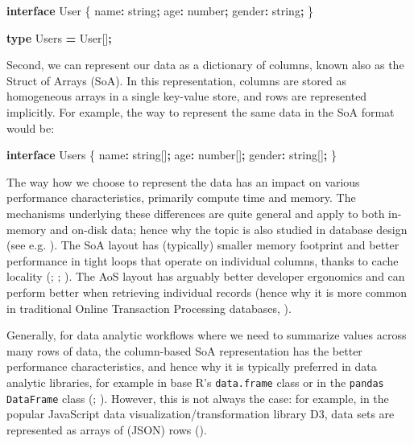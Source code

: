 \documentclass[
]{book}
\newenvironment{Shaded}{\begin{snugshade}}{\end{snugshade}}
\newcommand{\DataTypeTok}[1]{\textcolor[rgb]{0.13,0.29,0.53}{#1}}
\newcommand{\KeywordTok}[1]{\textcolor[rgb]{0.13,0.29,0.53}{\textbf{#1}}}
\newcommand{\NormalTok}[1]{#1}
\newcommand{\OperatorTok}[1]{\textcolor[rgb]{0.81,0.36,0.00}{\textbf{#1}}}
\theoremstyle{definition}
\theoremstyle{definition}
\theoremstyle{definition}
\theoremstyle{definition}
\theoremstyle{remark}
\begin{document}
\begin{Shaded}
\begin{Highlighting}[]
\KeywordTok{interface}\NormalTok{ User \{}
\NormalTok{  name}\OperatorTok{:} \DataTypeTok{string}\OperatorTok{;}
\NormalTok{  age}\OperatorTok{:} \DataTypeTok{number}\OperatorTok{;}
\NormalTok{  gender}\OperatorTok{:} \DataTypeTok{string}\OperatorTok{;}
\NormalTok{\}}

\KeywordTok{type}\NormalTok{ Users }\OperatorTok{=}\NormalTok{ User[]}\OperatorTok{;}
\end{Highlighting}
\end{Shaded}

Second, we can represent our data as a dictionary of columns, known also as the Struct of Arrays (SoA). In this representation, columns are stored as homogeneous arrays in a single key-value store, and rows are represented implicitly. For example, the way to represent the same data in the SoA format would be:

\begin{Shaded}
\begin{Highlighting}[]
\KeywordTok{interface}\NormalTok{ Users \{}
\NormalTok{  name}\OperatorTok{:} \DataTypeTok{string}\NormalTok{[]}\OperatorTok{;}
\NormalTok{  age}\OperatorTok{:} \DataTypeTok{number}\NormalTok{[]}\OperatorTok{;}
\NormalTok{  gender}\OperatorTok{:} \DataTypeTok{string}\NormalTok{[]}\OperatorTok{;}
\NormalTok{\}}
\end{Highlighting}
\end{Shaded}

The way how we choose to represent the data has an impact on various performance characteristics, primarily compute time and memory. The mechanisms underlying these differences are quite general and apply to both in-memory and on-disk data; hence why the topic is also studied in database design (see e.g. ). The SoA layout has (typically) smaller memory footprint and better performance in tight loops that operate on individual columns, thanks to cache locality (; ; ). The AoS layout has arguably better developer ergonomics and can perform better when retrieving individual records (hence why it is more common in traditional Online Transaction Processing databases, ).

Generally, for data analytic workflows where we need to summarize values across many rows of data, the column-based SoA representation has the better performance characteristics, and hence why it is typically preferred in data analytic libraries, for example in base R's \texttt{data.frame} class or in the \texttt{pandas} \texttt{DataFrame} class (; ). However, this is not always the case: for example, in the popular JavaScript data visualization/transformation library D3, data sets are represented as arrays of (JSON) rows ().
\end{document}
